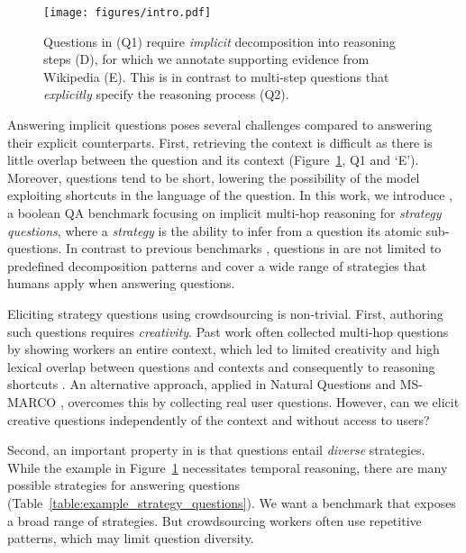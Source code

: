 {\begin{figure}
    \centering
    \texttt{[image: figures/intro.pdf]}
    \caption{
        Questions in \strategyqa{} (Q1) require \emph{implicit} decomposition into reasoning steps (D), for which we annotate supporting evidence from Wikipedia (E). This is in contrast to multi-step questions that \emph{explicitly} specify the reasoning process (Q2). 
    }
    \label{figure:intro}
\end{figure}

Answering implicit questions poses several challenges compared to answering their explicit counterparts. 
First, retrieving the context is difficult as there is little overlap between the question and its context (Figure~\ref{figure:intro}, Q1 and `E').  Moreover, questions tend to be short,  lowering the possibility of the model exploiting shortcuts in the language of the question.
In this work, we introduce \strategyqa{}, a boolean QA benchmark focusing on implicit multi-hop reasoning for \emph{strategy questions}, where a \emph{strategy} is the ability to infer from a question its atomic sub-questions. 
In contrast to previous benchmarks \cite{khot2020qasc, yang2018hotpotqa}, questions in \strategyqa{} are not limited to predefined decomposition patterns and cover a wide range of strategies that humans apply when answering questions.

Eliciting strategy questions using crowdsourcing is non-trivial.
First, authoring such questions requires \emph{creativity}. Past work often collected multi-hop questions by showing workers an entire context, which led to limited creativity and high lexical overlap between questions and contexts and consequently to reasoning shortcuts \cite{khot2020qasc, yang2018hotpotqa}. An alternative approach, applied in Natural Questions \cite{kwiatkowski2019natural} and MS-MARCO \cite{nguyen2016ms}, overcomes this by collecting real user questions. However, can we elicit creative questions independently of the context and without access to users?

Second, an important property in \strategyqa{} is that questions entail \emph{diverse} strategies. While the example in Figure~\ref{figure:intro} necessitates temporal reasoning, there are many possible strategies for answering questions (Table~\ref{table:example_strategy_questions}). We want a benchmark that exposes a broad range of strategies. But crowdsourcing workers often use repetitive patterns, which may limit question diversity. 

}
